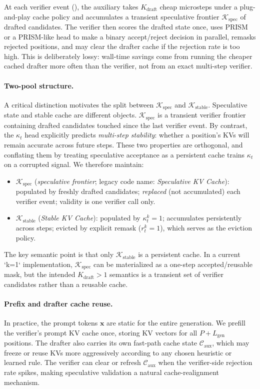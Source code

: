 \documentclass[11pt]{article}
\newcommand{\cK}{\mathcal{K}}
\newcommand{\cC}{\mathcal{C}}
\newcommand{\bx}{\mathbf{x}}
\begin{document}
At each verifier event (), the auxiliary takes $K_{\text{draft}}$ cheap microsteps under a plug-and-play cache policy and accumulates a transient speculative frontier $\cK_{\text{spec}}$ of drafted candidates. The verifier then scores the drafted state once, uses PRISM or a PRISM-like head to make a binary accept/reject decision in parallel, remasks rejected positions, and may clear the drafter cache if the rejection rate is too high. This is deliberately lossy: wall-time savings come from running the cheaper cached drafter more often than the verifier, not from an exact multi-step verifier.

\paragraph{Two-pool structure.}
A critical distinction motivates the split between $\cK_{\text{spec}}$ and $\cK_{\text{stable}}$.
Speculative state and stable cache are different objects.
$\cK_{\text{spec}}$ is a transient verifier frontier containing drafted candidates touched since the last verifier event.
By contrast, the $\kappa_t$ head explicitly predicts \emph{multi-step stability}: whether a position's KVs will remain accurate across future steps.
These two properties are orthogonal, and conflating them by treating speculative acceptance as a persistent cache trains $\kappa_t$ on a corrupted signal.
We therefore maintain:
\begin{itemize}[itemsep=2pt]
    \item $\cK_{\text{spec}}$ (\emph{speculative frontier}; legacy code name: \emph{Speculative KV Cache}): populated by freshly drafted candidates; \emph{replaced} (not accumulated) each verifier event; validity is one verifier call only.
    \item $\cK_{\text{stable}}$ (\emph{Stable KV Cache}): populated by $\kappa_t^k = 1$; accumulates persistently across steps; evicted by explicit remask ($r_t^k = 1$), which serves as the eviction policy.
\end{itemize}
The key semantic point is that only $\cK_{\text{stable}}$ is a persistent cache. In a current `k{=}1` implementation, $\cK_{\text{spec}}$ can be materialized as a one-step accepted/reusable mask, but the intended $K_{\text{draft}}{>}1$ semantics is a transient set of verifier candidates rather than a reusable cache.

\paragraph{Prefix and drafter cache reuse.}
In practice, the prompt tokens $\bx$ are static for the entire generation.
We prefill the verifier's prompt KV cache once, storing KV vectors for all $P + L_{\text{gen}}$ positions.
The drafter also carries its own fast-path cache state $\cC_{\text{aux}}$, which may freeze or reuse KVs more aggressively according to any chosen heuristic or learned rule.
The verifier can clear or refresh $\cC_{\text{aux}}$ when the verifier-side rejection rate spikes, making speculative validation a natural cache-realignment mechanism.
\end{document}

